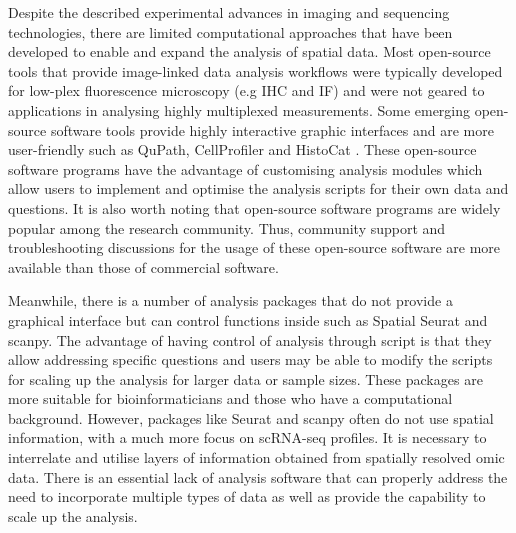 Despite the described experimental advances in imaging and sequencing technologies, there are limited computational approaches that have been developed to enable and expand the analysis of spatial data. Most open-source tools that provide image-linked data analysis workflows were typically developed for low-plex fluorescence microscopy (e.g IHC and IF) and were not geared to applications in analysing highly multiplexed measurements. Some emerging open-source software tools provide highly interactive graphic interfaces and are more user-friendly such as QuPath, CellProfiler and HistoCat \cite{bankhead2017qupath, carpenter2006cellprofiler, schapiro2017histocat}. These open-source software programs have the advantage of customising analysis modules which allow users to implement and optimise the analysis scripts for their own data and questions. It is also worth noting that open-source software programs are widely popular among the research community. Thus, community support and troubleshooting discussions for the usage of these open-source software are more available  than those of commercial software. 

Meanwhile, there is a number of analysis packages that do not provide a graphical interface but can control functions inside such as Spatial Seurat and scanpy. The advantage of having control of analysis through script is that they allow addressing specific questions and users may be able to modify the scripts for scaling up the analysis for larger data or sample sizes. These packages are more suitable for bioinformaticians and those who have a computational background. However, packages like Seurat and scanpy often do not use spatial information, with a much more focus on scRNA-seq profiles. It is necessary to interrelate and utilise layers of information obtained from spatially resolved omic data. There is an essential lack of analysis software that can properly address the need to incorporate multiple types of data as well as provide the capability to scale up the analysis.


\label{subsec:ST_seq}

